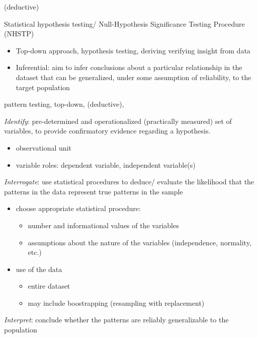 \documentclass[
]{article}
\providecommand{\tightlist}{%
  \setlength{\itemsep}{0pt}\setlength{\parskip}{0pt}}
\begin{document}
(deductive)

Statistical hypothesis testing/ Null-Hypothesis Significance Testing Procedure (NHSTP)

\begin{itemize}
\item
  Top-down approach, hypothesis testing, deriving verifying insight from data
\item
  Inferential: aim to infer conclusions about a particular relationship in the dataset that can be generalized, under some assumption of reliability, to the target population
\end{itemize}

pattern testing, top-down, (deductive),

\emph{Identify}: pre-determined and operationalized (practically measured) set of variables, to provide confirmatory evidence regarding a hypothesis.

\begin{itemize}
\tightlist
\item
  observational unit
\item
  variable roles: dependent variable, independent variable(s)
\end{itemize}

\emph{Interrogate}: use statistical procedures to deduce/ evaluate the likelihood that the patterns in the data represent true patterns in the sample

\begin{itemize}
\tightlist
\item
  choose appropriate statistical procedure:

  \begin{itemize}
  \tightlist
  \item
    number and informational values of the variables
  \item
    assumptions about the nature of the variables (independence, normality, etc.)
  \end{itemize}
\item
  use of the data

  \begin{itemize}
  \tightlist
  \item
    entire dataset
  \item
    may include boostrapping (resampling with replacement)
  \end{itemize}
\end{itemize}

\emph{Interpret}: conclude whether the patterns are reliably generalizable to the population
\end{document}
